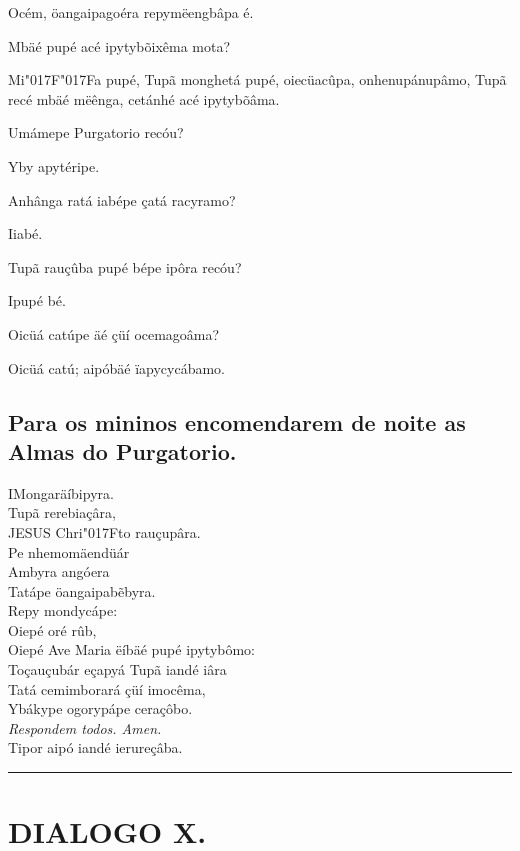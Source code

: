 \documentclass[openany,titlepage,12pt]{book}
\newcommand{\lgS}{\char"017F}
\newcommand{\lgSS}{\char"017F\char"017F}
\begin{document}
\begin{altereven}
    \item Océm, öangaipagoéra repymëengbâpa é.
    \item Mbäé pupé acé ipytybõixêma mota?
    \item Mi\lgSS a pupé, Tupã monghetá pupé, oiecüacûpa, 
    onhenupánupâmo, Tupã recé mbäé mëênga, cetánhé acé ipytybõâma.
    \item Umámepe Purgatorio recóu?
    \item Yby apytéripe.
    \item Anhânga ratá iabépe çatá racyramo?
    \item Iiabé.
    \item Tupã rauçûba pupé bépe ipôra recóu?
    \item Ipupé bé.
    \item Oicüá catúpe äé çüí ocemagoâma?
    \item Oicüá catú; aipóbäé ïapycycábamo. 

\end{altereven}

\subsection{Para os mininos encomendarem de noite as Almas
do Purgatorio.}

\lettrine[findent =4pt, nindent=0pt, lines=2]
{I}{M}ongaräíbipyra.\\Tupã rerebiaçâra,\\
JESUS Chri\lgS to rauçupâra.\\
Pe nhemomäendüár\\
Ambyra angóera\\
Tatápe öangaipab\~ebyra.\\
Repy mondycápe:\\
Oiepé oré rûb,\\
Oiepé Ave Maria ëíbäé pupé ipytybômo:\\
Toçauçubár eçapyá Tupã iandé iâra\\
Tatá cemimborará çüí imocêma,\\
Ybákype ogorypápe ceraçôbo.\\
\hspace*{20pt} \textit{Respondem todos. Amen.}\\
Tipor aipó iandé ierureçâba.


\vspace{2pt}
\par\noindent\rule{\textwidth}{0.4pt}
\unskip\vspace*{2pt}
\section{DIALOGO X.}
\end{document}
